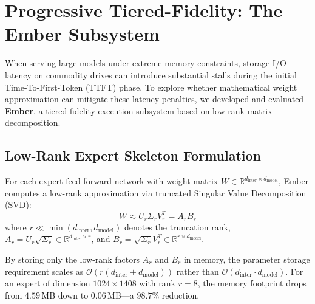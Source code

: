 \section{Progressive Tiered-Fidelity: The Ember Subsystem}
\label{sec:ember}

When serving large models under extreme memory constraints, storage I/O latency on commodity drives can introduce substantial stalls during the initial Time-To-First-Token (TTFT) phase. To explore whether mathematical weight approximation can mitigate these latency penalties, we developed and evaluated \textbf{Ember}, a tiered-fidelity execution subsystem based on low-rank matrix decomposition.

\subsection{Low-Rank Expert Skeleton Formulation}
For each expert feed-forward network with weight matrix $W \in \mathbb{R}^{d_{\text{inter}} \times d_{\text{model}}}$, Ember computes a low-rank approximation via truncated Singular Value Decomposition (SVD):
\begin{equation}
W \approx U_r \Sigma_r V_r^T = A_r B_r
\end{equation}
where $r \ll \min(d_{\text{inter}}, d_{\text{model}})$ denotes the truncation rank, $A_r = U_r \sqrt{\Sigma_r} \in \mathbb{R}^{d_{\text{inter}} \times r}$, and $B_r = \sqrt{\Sigma_r} V_r^T \in \mathbb{R}^{r \times d_{\text{model}}}$. 

By storing only the low-rank factors $A_r$ and $B_r$ in memory, the parameter storage requirement scales as $\mathcal{O}(r(d_{\text{inter}} + d_{\text{model}}))$ rather than $\mathcal{O}(d_{\text{inter}} \cdot d_{\text{model}})$. For an expert of dimension $1024 \times 1408$ with rank $r=8$, the memory footprint drops from $4.59$\,MB down to $0.06$\,MB—a $98.7\%$ reduction.


